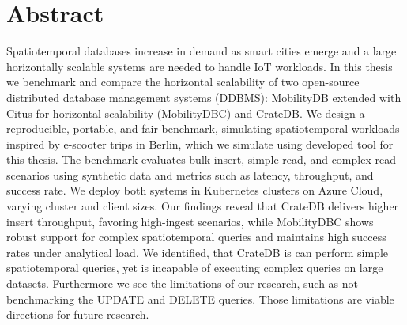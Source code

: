\documentclass[a4paper, 11pt]{article}
\begin{document}


\newpage

\section*{Abstract}
Spatiotemporal databases increase in demand as smart cities emerge and a large horizontally scalable systems are needed to handle IoT workloads.
In this thesis we benchmark and compare the horizontal scalability of two open-source distributed database management systems (DDBMS): MobilityDB extended with Citus for horizontal scalability (MobilityDBC) and CrateDB.
We design a reproducible, portable, and fair benchmark, simulating spatiotemporal workloads inspired by e-scooter trips in Berlin, which we simulate using developed tool for this thesis.
The benchmark evaluates bulk insert, simple read, and complex read scenarios using synthetic data and metrics such as latency, throughput, and success rate.
We deploy both systems in Kubernetes clusters on Azure Cloud, varying cluster and client sizes.
Our findings reveal that CrateDB delivers higher insert throughput, favoring high-ingest scenarios, while MobilityDBC shows robust support for complex spatiotemporal queries and maintains high success rates under analytical load.
We identified, that CrateDB is can perform simple spatiotemporal queries, yet is incapable of executing complex queries on large datasets.
Furthermore we see the limitations of our research, such as not benchmarking the UPDATE and DELETE queries.
Those limitations are viable directions for future research.
\end{document}
